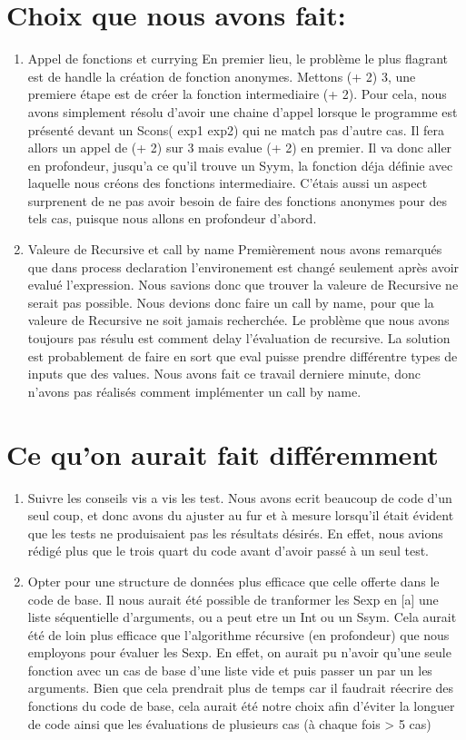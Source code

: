 \documentclass{article}
\begin{document}
\section*{Choix que nous avons fait:}
\begin{enumerate}
    \item Appel de fonctions et currying
    En premier lieu, le problème le plus flagrant est de handle la création de fonction anonymes. Mettons (+ 2) 3, une premiere étape est de créer la fonction intermediaire (+ 2). Pour cela, nous avons simplement résolu d'avoir une chaine d'appel lorsque le programme est présenté devant un Scons( exp1 exp2) qui ne match pas d'autre cas. Il fera allors un appel de (+ 2) sur 3 mais evalue (+ 2) en premier. Il va donc aller en profondeur, jusqu'a ce qu'il trouve un Syym, la fonction déja définie avec laquelle nous créons des fonctions intermediaire. C'étais aussi un aspect surprenent de ne pas avoir besoin de faire des fonctions anonymes pour des tels cas, puisque nous allons en profondeur d'abord.
    \item Valeure de Recursive et call by name
    Premièrement nous avons remarqués que dans process declaration l'environement est changé seulement après avoir evalué l'expression. Nous savions donc que trouver la valeure de Recursive ne serait pas possible. Nous devions donc faire un call by name, pour que la valeure de Recursive ne soit jamais recherchée. Le problème que nous avons toujours pas résulu est comment delay l'évaluation de recursive. La solution est probablement de faire en sort que eval puisse prendre différentre types de inputs que des values. Nous avons fait ce travail derniere minute, donc n'avons pas réalisés comment implémenter un call by name.
    
\end{enumerate}

\section*{Ce qu'on aurait fait différemment}
\begin{enumerate}
    \item Suivre les conseils vis a vis les test. Nous avons ecrit beaucoup de code d'un seul coup, et donc avons du ajuster au fur et à mesure lorsqu'il était évident que les tests ne produisaient pas les résultats désirés. En effet, nous avions rédigé plus que le trois quart du code avant d'avoir passé à un seul test.
    \item Opter pour une structure de données plus efficace que celle offerte dans le code de base. Il nous aurait été possible de tranformer les Sexp en [a] une liste séquentielle d'arguments, ou a peut etre un Int ou un Ssym. Cela aurait été de loin plus efficace que l'algorithme récursive (en profondeur) que nous employons pour évaluer les Sexp. En effet, on aurait pu n'avoir qu'une seule fonction avec un cas de base d'une liste vide et puis passer un par un les arguments. Bien que cela prendrait plus de temps car il faudrait réecrire des fonctions du code de base, cela aurait été notre choix afin d'éviter la longuer de code ainsi que les évaluations de plusieurs cas (à chaque fois > 5 cas) 
\end{enumerate}
\end{document}
